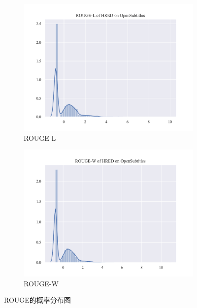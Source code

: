 \begin{figure}[H]
\begin{subfigure}{0.5\linewidth}
        \includegraphics[width=\linewidth]{figure/distplot/opensub/hred/rouge_l/plot.pdf}
        \caption{ROUGE-L}
    \end{subfigure}%
    \begin{subfigure}{0.5\linewidth}
        \centering
        \includegraphics[width=\linewidth]{figure/distplot/opensub/hred/rouge_w/plot.pdf}
        \caption{ROUGE-W}
    \end{subfigure}
    \centering
    \caption{ROUGE的概率分布图}
    \label{fig:ROUGE_dist}
\end{figure}
